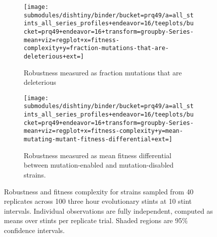 \begin{figure}
\begin{center}

\begin{subfigure}[b]{\textwidth}
\centering
\texttt{[image: submodules/dishtiny/binder/bucket=prq49/a=all\_stints\_all\_series\_profiles+endeavor=16/teeplots/bucket=prq49+endeavor=16+transform=groupby-Series-mean+viz=regplot+x=fitness-complexity+y=fraction-mutations-that-are-deleterious+ext=]}%
\caption{
Robustness measured as fraction mutations that are deleterious
}
\label{fig:robustness-vs-fitness-complexity-fraction-mutations-that-are-deleterious}
\end{subfigure}

\begin{subfigure}[b]{\columnwidth}
\centering
\texttt{[image: submodules/dishtiny/binder/bucket=prq49/a=all\_stints\_all\_series\_profiles+endeavor=16/teeplots/bucket=prq49+endeavor=16+transform=groupby-Series-mean+viz=regplot+x=fitness-complexity+y=mean-mutating-mutant-fitness-differential+ext=]}
\caption{
Robustness measured as mean fitness differential between mutation-enabled and mutation-disabled strains.
}
\label{fig:robustness-vs-fitness-complexity-mean-mutating-mutant-fitness-differential}
\end{subfigure}

\caption{
Robustness and fitness complexity for strains sampled from 40 replicates across 100 three hour evolutionary stints at 10 stint intervals.
Individual observations are fully independent, computed as means over stints per replicate trial.
Shaded regions are 95\% confidence intervals.
}
\label{fig:robustness-vs-fitness-complexity}

\end{center}
\end{figure}
